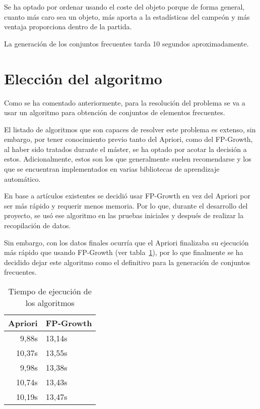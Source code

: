 Se ha optado por ordenar usando el coste del objeto porque de forma general, cuanto más caro sea un objeto, más aporta a la estadísticas del campeón y más ventaja proporciona dentro de la partida.

La generación de los conjuntos frecuentes tarda 10 segundos aproximadamente.

\section{Elección del algoritmo}
Como se ha comentado anteriormente, para la resolución del problema se va a usar un algoritmo para obtención de conjuntos de elementos frecuentes.

El listado de algoritmos \cite{chee_jaafar_aziz_hasan_yeoh_2018} que son capaces de resolver este problema es extenso, sin embargo, por tener conocimiento previo tanto del Apriori, como del FP-Growth, al haber sido tratados durante el máster, se ha optado por acotar la decisión a estos. Adicionalmente, estos son los que generalmente suelen recomendarse y los que se encuentran implementados en varias bibliotecas de aprendizaje automático.

En base a artículos existentes \cite{chonyy_2020_apriori, chonyy_2020_fpgrowth}se decidió usar FP-Growth en vez del Apriori por ser más rápido y requerir menos memoria. Por lo que, durante el desarrollo del proyecto, se usó ese algoritmo en las pruebas iniciales y después de realizar la recopilación de datos.

Sin embargo, con los datos finales ocurría que el Apriori finalizaba su ejecución más rápido que usando FP-Growth (ver tabla~\ref{tab:tiempo-algos}), por lo que finalmente se ha decidido dejar este algoritmo como el definitivo para la generación de conjuntos frecuentes.

\begin{table}[h]
	\centering
	\begin{tabular}{rl}\toprule
		\textbf{Apriori} & \textbf{FP-Growth} \\
		\midrule
		9,88s   & 13,14s    \\
		10,37s  & 13,55s    \\
		9,98s   & 13,38s    \\
		10,74s  & 13,43s    \\
		10,19s  & 13,47s    \\ \bottomrule
	\end{tabular}
	\caption{Tiempo de ejecución de los algoritmos}
	\label{tab:tiempo-algos}
\end{table}